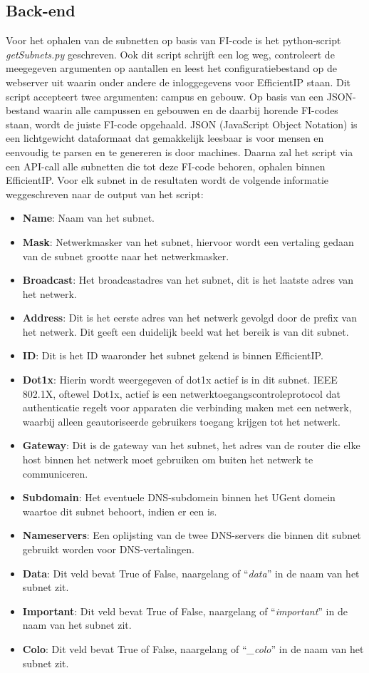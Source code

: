 \subsection{Back-end}
Voor het ophalen van de subnetten op basis van FI-code is het python-script \textit{getSubnets.py} geschreven. Ook dit script schrijft een log weg, controleert de meegegeven argumenten op aantallen en leest het configuratiebestand op de webserver uit waarin onder andere de inloggegevens voor EfficientIP staan. Dit script accepteert twee argumenten: campus en gebouw. Op basis van een JSON-bestand waarin alle campussen en gebouwen en de daarbij horende FI-codes staan, wordt de juiste FI-code opgehaald. JSON (JavaScript Object Notation) is een lichtgewicht dataformaat dat gemakkelijk leesbaar is voor mensen en eenvoudig te parsen en te genereren is door machines. Daarna zal het script via een API-call alle subnetten die tot deze FI-code behoren, ophalen binnen EfficientIP. Voor elk subnet in de resultaten wordt de volgende informatie weggeschreven naar de output van het script:
\begin{itemize}
    \item \textbf{Name}: Naam van het subnet.
    \item \textbf{Mask}: Netwerkmasker van het subnet, hiervoor wordt een vertaling gedaan van de subnet grootte naar het netwerkmasker.
    \item \textbf{Broadcast}: Het broadcastadres van het subnet, dit is het laatste adres van het netwerk.
    \item \textbf{Address}: Dit is het eerste adres van het netwerk gevolgd door de prefix van het netwerk. Dit geeft een duidelijk beeld wat het bereik is van dit subnet.
    \item \textbf{ID}: Dit is het ID waaronder het subnet gekend is binnen EfficientIP.
    \item \textbf{Dot1x}: Hierin wordt weergegeven of dot1x actief is in dit subnet. IEEE 802.1X, oftewel Dot1x, actief is een netwerktoegangscontroleprotocol dat authenticatie regelt voor apparaten die verbinding maken met een netwerk, waarbij alleen geautoriseerde gebruikers toegang krijgen tot het netwerk. %
    \item \textbf{Gateway}: Dit is de gateway van het subnet, het adres van de router die elke host binnen het netwerk moet gebruiken om buiten het netwerk te communiceren.
    \item \textbf{Subdomain}: Het eventuele DNS-subdomein binnen het UGent domein waartoe dit subnet behoort, indien er een is.
    \item \textbf{Nameservers}: Een oplijsting van de twee DNS-servers die binnen dit subnet gebruikt worden voor DNS-vertalingen.
    \item \textbf{Data}: Dit veld bevat True of False, naargelang of “\textit{data}” in de naam van het subnet zit.
    \item \textbf{Important}: Dit veld bevat True of False, naargelang of “\textit{important}” in de naam van het subnet zit.
    \item \textbf{Colo}: Dit veld bevat True of False, naargelang of “\textit{\_colo}” in de naam van het subnet zit.
\end{itemize}
